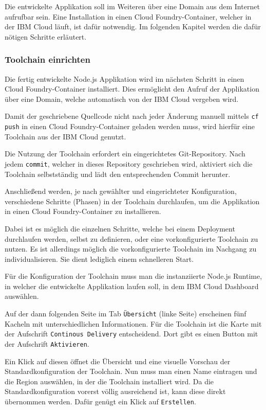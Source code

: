 Die entwickelte Applikation soll im Weiteren über eine Domain aus dem Internet aufrufbar sein. Eine Installation in einen
Cloud Foundry-Container, welcher in der IBM Cloud läuft, ist dafür notwendig. Im folgenden Kapitel werden die dafür
nötigen Schritte erläutert.

\subsubsection{Toolchain einrichten}
Die fertig entwickelte Node.js Applikation wird im nächsten Schritt in einen Cloud Foundry-Container installiert. Dies
ermöglicht den Aufruf der Applikation über eine Domain, welche automatisch von der IBM Cloud vergeben wird.

Damit der geschriebene Quellcode nicht nach jeder Änderung manuell mittels \texttt{cf push} in einen Cloud
Foundry-Container geladen werden muss, wird hierfür eine Toolchain aus der IBM Cloud genutzt.

Die Nutzung der Toolchain erfordert ein eingerichtetes Git-Repository. Nach jedem \texttt{commit}, welcher in dieses
Repository geschrieben wird, aktiviert sich die Toolchain selbstständig und lädt den entsprechenden Commit herunter.

Anschließend werden, je nach gewählter und eingerichteter Konfiguration, verschiedene Schritte (Phasen) in der Toolchain
durchlaufen, um die Applikation in einen Cloud Foundry-Container zu installieren.

Dabei ist es möglich die einzelnen Schritte, welche bei einem Deployment durchlaufen werden, selbst zu definieren, oder
eine vorkonfigurierte Toolchain zu nutzen. Es ist allerdings möglich die vorkonfigurierte Toolchain im Nachgang zu
individualisieren. Sie dient lediglich einem schnelleren Start.

Für die Konfiguration der Toolchain muss man die instanziierte Node.js Runtime, in welcher die entwickelte Applikation
laufen soll, in dem IBM Cloud Dashboard auswählen.

Auf der dann folgenden Seite im Tab \texttt{Übersicht} (linke Seite) erscheinen fünf Kacheln mit unterschiedlichen
Informationen. Für die Toolchain ist die Karte mit der Aufschrift \texttt{Continous Delivery} entscheidend. Dort gibt es
einen Button mit der Aufschrift \texttt{Aktivieren}.

Ein Klick auf diesen öffnet die Übersicht und eine visuelle Vorschau der Standardkonfiguration der Toolchain. Nun muss
man einen Name eintragen und die Region auswählen, in der die Toolchain installiert wird. Da die Standardkonfiguration
vorerst völlig ausreichend ist, kann diese direkt übernommen werden. Dafür genügt ein Klick auf \texttt{Erstellen}.

